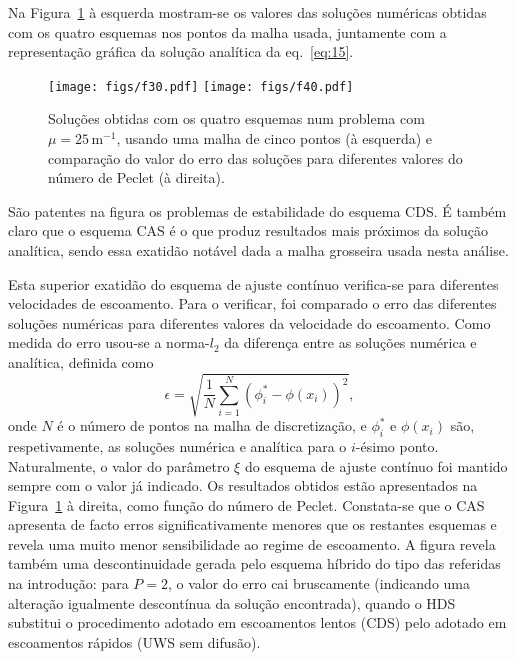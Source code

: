 \documentclass[11pt,twoside]{article}
\begin{document}
{Na Figura~\ref{fig:30} à esquerda mostram-se os valores das soluções numéricas obtidas com os quatro esquemas nos pontos da malha usada, juntamente com a representação gráfica da solução analítica da eq.~\eqref{eq:15}.
\begin{figure}[!h]
\centering
\texttt{[image: figs/f30.pdf]}\hfill
\texttt{[image: figs/f40.pdf]}
\caption{Soluções obtidas com os quatro esquemas num problema com $\mu=25\,\text{m}^{-1}$, usando uma malha de cinco pontos (à esquerda) e comparação do valor do erro das soluções para diferentes valores do número de Peclet (à direita).
\label{fig:30}}
\end{figure}
São patentes na figura os problemas de estabilidade do esquema CDS. É também
claro que o esquema CAS é o que produz resultados mais próximos da solução
analítica, sendo essa exatidão notável dada a malha grosseira usada nesta
análise.

Esta superior exatidão do esquema de ajuste contínuo verifica-se para diferentes
velocidades de escoamento. Para o verificar, foi comparado o erro das diferentes
soluções numéricas para diferentes valores da velocidade do escoamento. Como medida do
erro usou-se a norma-$l_2$ da diferença entre as soluções numérica e analítica,
definida como
\begin{equation}
    \epsilon = \sqrt{\frac{1}{N}\sum_{i=1}^N(\phi^*_i-\phi(x_i))^2},
\end{equation}
onde $N$ é o número de pontos na malha de discretização, e $\phi^*_i$ e
$\phi(x_i)$ são, respetivamente, as soluções numérica e analítica para o
$i$-ésimo ponto. Naturalmente, o valor do parâmetro $\xi$ do esquema de ajuste
contínuo foi mantido sempre com o valor já indicado. Os resultados obtidos estão apresentados na Figura~\ref{fig:30} à direita, como função do número de Peclet.
Constata-se que o CAS apresenta de facto erros significativamente menores que os
restantes esquemas e revela uma muito menor sensibilidade ao regime de
escoamento. A figura revela também uma descontinuidade gerada pelo esquema
híbrido do tipo das referidas na introdução: para $P=2$, o valor do erro cai
bruscamente (indicando uma alteração igualmente descontínua da solução encontrada), quando o HDS substitui o procedimento adotado em escoamentos lentos
(CDS) pelo adotado em escoamentos rápidos (UWS sem difusão).

}
\end{document}
